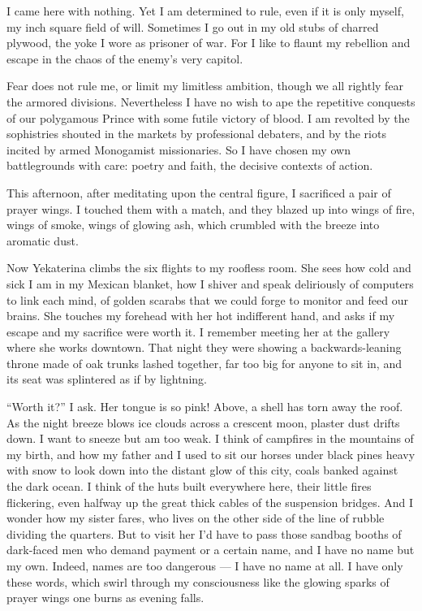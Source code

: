 \documentclass[english,11pt,letterpaper,onecolumn]{scrbook}
\begin{document}
	I came here with nothing.  Yet I am determined to rule, even if it is only myself, my inch square field of will.  Sometimes I go out in my old stubs of charred plywood, the yoke I wore as prisoner of war.  For I like to flaunt my rebellion and escape in the chaos of the enemy's very capitol.

	Fear does not rule me, or limit my limitless ambition, though we all rightly fear the armored divisions.  Nevertheless I have no wish to ape the repetitive conquests of our polygamous Prince with some futile victory of blood.  I am revolted by the sophistries shouted in the markets by professional debaters, and by the riots incited by armed Monogamist missionaries.  So I have chosen my own battlegrounds with care:  poetry and faith, the decisive contexts of action.

	This afternoon, after meditating upon the central figure, I sacrificed a pair of prayer wings.  I touched them with a match, and they blazed up into wings of fire, wings of smoke, wings of glowing ash, which crumbled with the breeze into aromatic dust.

	Now Yekaterina climbs the six flights to my roofless room.  She sees how cold and sick I am in my Mexican blanket, how I shiver and speak deliriously of computers to link each mind, of golden scarabs that we could forge to monitor and feed our brains.  She touches my forehead with her hot indifferent hand, and asks if my escape and my sacrifice were worth it.  I remember meeting her at the gallery where she works downtown.  That night they were showing a backwards-leaning throne made of oak trunks lashed together, far too big for anyone to sit in, and its seat was splintered as if by lightning.

	``Worth it?'' I ask.  Her tongue is so pink!  Above, a shell has torn away the roof.  As the night breeze blows ice clouds across a crescent moon, plaster dust drifts down.  I want to sneeze but am too weak.  I think of campfires in the mountains of my birth, and how my father and I used to sit our horses under black pines heavy with snow to look down into the distant glow of this city, coals banked against the dark ocean.  I think of the huts built everywhere here, their little fires flickering, even halfway up the great thick cables of the suspension bridges.  And I wonder how my sister fares, who lives on the other side of the line of rubble dividing the quarters.  But to visit her I'd have to pass those sandbag booths of dark-faced men who demand payment or a certain name, and I have no name but my own.  Indeed, names are too dangerous --- I have no name at all.  I have only these words, which swirl through my consciousness like the glowing sparks of prayer wings one burns as evening falls.
\end{document}
